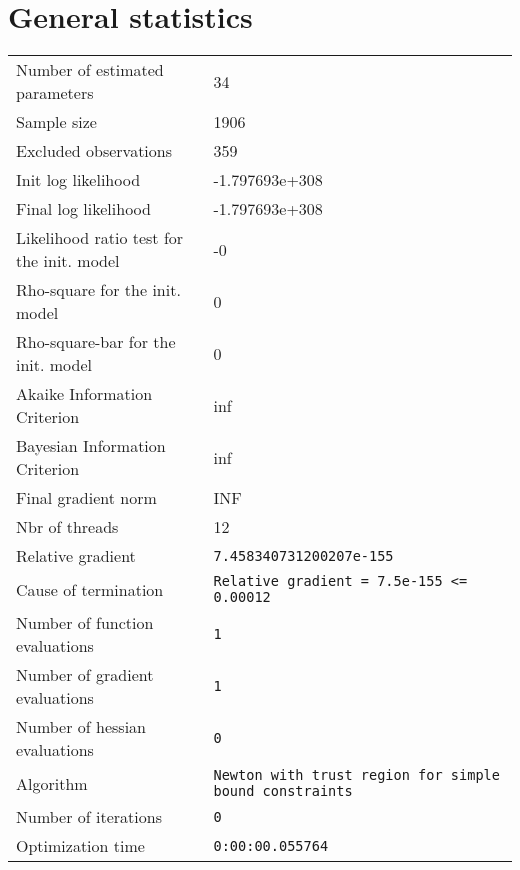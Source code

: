 



\section{General statistics}
\begin{tabular}{ll}
Number of estimated parameters & 34 \\
Sample size & 1906 \\
Excluded observations & 359 \\
Init log likelihood & -1.797693e+308 \\
Final log likelihood & -1.797693e+308 \\
Likelihood ratio test for the init. model & -0 \\
Rho-square for the init. model & 0 \\
Rho-square-bar for the init. model & 0 \\
Akaike Information Criterion & inf \\
Bayesian Information Criterion & inf \\
Final gradient norm & INF \\
Nbr of threads & 12 \\
Relative gradient & \verb$7.458340731200207e-155$ \\
Cause of termination & \verb$Relative gradient = 7.5e-155 <= 0.00012$ \\
Number of function evaluations & \verb$1$ \\
Number of gradient evaluations & \verb$1$ \\
Number of hessian evaluations & \verb$0$ \\
Algorithm & \verb$Newton with trust region for simple bound constraints$ \\
Number of iterations & \verb$0$ \\
Optimization time & \verb$0:00:00.055764$ \\
\end{tabular}

